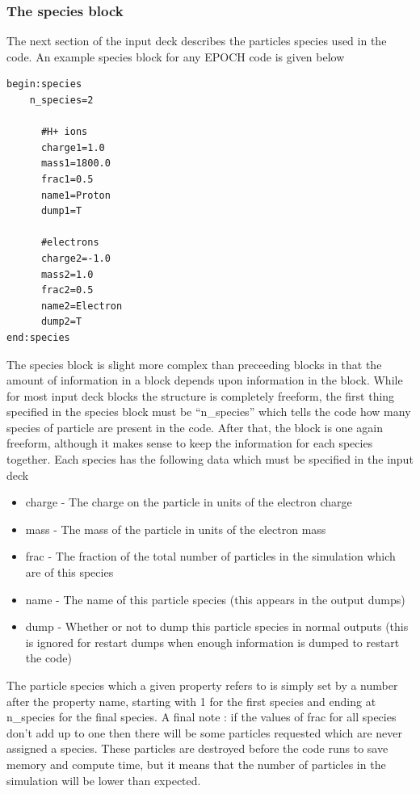 \documentclass[12pt]{article}
\begin{document}
\subsubsection{The species block}
The next section of the input deck describes the particles species used in the code. An example species block for any EPOCH code is given below\\
\begin{verbatim}
begin:species
	n_species=2

      #H+ ions
      charge1=1.0
      mass1=1800.0 
      frac1=0.5
      name1=Proton
      dump1=T

      #electrons
      charge2=-1.0
      mass2=1.0
      frac2=0.5
      name2=Electron
      dump2=T
end:species
\end{verbatim}
The species block is slight more complex than preceeding blocks in that the amount of information in a block depends upon information in the block. While for most input deck blocks the structure is completely freeform, the first thing specified in the species block must be ``n\_species'' which tells the code how many species of particle are present in the code. After that, the block is one again freeform, although it makes sense to keep the information for each species together. Each species has the following data which must be specified in the input deck\\
\begin{itemize}
\item charge - The charge on the particle in units of the electron charge
\item mass - The mass of the particle in units of the electron mass
\item frac - The fraction of the total number of particles in the simulation which are of this species
\item name - The name of this particle species (this appears in the output dumps)
\item dump - Whether or not to dump this particle species in normal outputs (this is ignored for restart dumps when enough information is dumped to restart the code)
\end{itemize}
The particle species which a given property refers to is simply set by a number after the property name, starting with 1 for the first species and ending at n\_species for the final species. A final note : if the values of frac for all species don't add up to one then there will be some particles requested which are never assigned a species. These particles are destroyed before the code runs to save memory and compute time, but it means that the number of particles in the simulation will be lower than expected.\\
\end{document}
